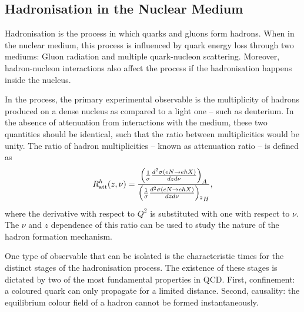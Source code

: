 \subsection{Hadronisation in the Nuclear Medium}
    Hadronisation is the process in which quarks and gluons form hadrons.
    When in the nuclear medium, this process is influenced by quark energy loss through two mediums: Gluon radiation and multiple quark-nucleon scattering.
    Moreover, hadron-nucleon interactions also affect the process if the hadronisation happens inside the nucleus.

    In the process, the primary experimental observable is the multiplicity of hadrons produced on a dense nucleus as compared to a light one -- such as deuterium.
    In the absence of attenuation from interactions with the medium, these two quantities should be identical, such that the ratio between multiplicities would be unity.
    The ratio of hadron multiplicities -- known as attenuation ratio -- is defined as
    \begin{equation*}
        R^h_{\text{att}}(z,\nu) = \frac
                {\left( \frac{1}{\sigma} \frac{d^2\sigma(eN \rightarrow ehX)}{dzd\nu} \right)_A}
                {\left( \frac{1}{\sigma} \frac{d^2\sigma(eN \rightarrow ehX)}{dzd\nu} \right)_{\prescript{2}{}{H}}},
    \end{equation*}
    where the derivative with respect to $Q^2$ is substituted with one with respect to $\nu$.
    The $\nu$ and $z$ dependence of this ratio can be used to study the nature of the hadron formation mechanism.

    One type of observable that can be isolated is the characteristic times for the distinct stages of the hadronisation process.
    The existence of these stages is dictated by two of the most fundamental properties in QCD.
    First, confinement: a coloured quark can only propagate for a limited distance.
    Second, causality: the equilibrium colour field of a hadron cannot be formed instantaneously.

    
    
    
